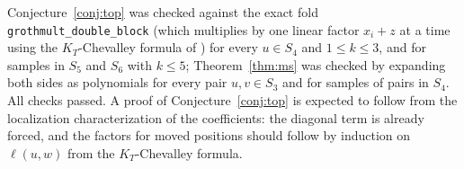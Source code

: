 \documentclass{amsart}
\theoremstyle{definition}
\theoremstyle{remark}
\newcommand{\pyid}[1]{\texttt{#1}}
\begin{document}
Conjecture~\ref{conj:top} was checked against the exact fold
\pyid{grothmult\_double\_block} (which multiplies by one linear factor $x_i+z$ at a time using the
$K_T$-Chevalley formula of \cite{lenart2007affine}) for every $u\in S_4$ and $1\le k\le 3$, and for
samples in $S_5$ and $S_6$ with $k\le5$; Theorem~\ref{thm:ms} was checked by expanding both
sides as polynomials for every pair $u,v\in S_3$ and for samples of pairs in $S_4$. All checks passed. A proof of
Conjecture~\ref{conj:top} is expected to follow from the localization characterization of
the coefficients: the diagonal term is already forced, and the factors for moved positions
should follow by induction on $\ell(u,w)$ from the $K_T$-Chevalley formula.



\end{document}

